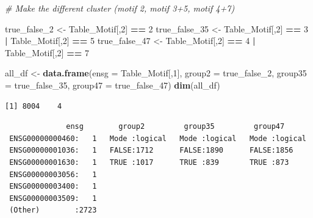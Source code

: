 \documentclass[]{article}
\newenvironment{Shaded}{\begin{snugshade}}{\end{snugshade}}
\newcommand{\KeywordTok}[1]{\textcolor[rgb]{0.13,0.29,0.53}{\textbf{#1}}}
\newcommand{\DataTypeTok}[1]{\textcolor[rgb]{0.13,0.29,0.53}{#1}}
\newcommand{\DecValTok}[1]{\textcolor[rgb]{0.00,0.00,0.81}{#1}}
\newcommand{\StringTok}[1]{\textcolor[rgb]{0.31,0.60,0.02}{#1}}
\newcommand{\CommentTok}[1]{\textcolor[rgb]{0.56,0.35,0.01}{\textit{#1}}}
\newcommand{\OperatorTok}[1]{\textcolor[rgb]{0.81,0.36,0.00}{\textbf{#1}}}
\newcommand{\NormalTok}[1]{#1}
\begin{document}
\begin{Shaded}
\begin{Highlighting}[]
\CommentTok{# Make the different cluster (motif 2, motif 3+5, motif 4+7)}

\NormalTok{true_false_}\DecValTok{2}\NormalTok{ <-}\StringTok{ }\NormalTok{Table_Motif[,}\DecValTok{2}\NormalTok{] }\OperatorTok{==}\StringTok{ }\DecValTok{2}
\NormalTok{true_false_}\DecValTok{35}\NormalTok{ <-}\StringTok{ }\NormalTok{Table_Motif[,}\DecValTok{2}\NormalTok{] }\OperatorTok{==}\StringTok{ }\DecValTok{3} \OperatorTok{|}\StringTok{ }\NormalTok{Table_Motif[,}\DecValTok{2}\NormalTok{] }\OperatorTok{==}\StringTok{ }\DecValTok{5}
\NormalTok{true_false_}\DecValTok{47}\NormalTok{ <-}\StringTok{ }\NormalTok{Table_Motif[,}\DecValTok{2}\NormalTok{] }\OperatorTok{==}\StringTok{ }\DecValTok{4} \OperatorTok{|}\StringTok{ }\NormalTok{Table_Motif[,}\DecValTok{2}\NormalTok{] }\OperatorTok{==}\StringTok{ }\DecValTok{7}

\NormalTok{all_df <-}\StringTok{ }\KeywordTok{data.frame}\NormalTok{(}\DataTypeTok{ensg =}\NormalTok{ Table_Motif[,}\DecValTok{1}\NormalTok{], }\DataTypeTok{group2 =}\NormalTok{ true_false_}\DecValTok{2}\NormalTok{, }\DataTypeTok{group35 =}\NormalTok{ true_false_}\DecValTok{35}\NormalTok{, }\DataTypeTok{group47 =}\NormalTok{ true_false_}\DecValTok{47}\NormalTok{)}
\KeywordTok{dim}\NormalTok{(all_df)}
\end{Highlighting}
\end{Shaded}

\begin{verbatim}
[1] 8004    4
\end{verbatim}

\begin{Shaded}
\end{Shaded}

\begin{verbatim}
              ensg        group2         group35         group47       
 ENSG00000000460:   1   Mode :logical   Mode :logical   Mode :logical  
 ENSG00000001036:   1   FALSE:1712      FALSE:1890      FALSE:1856     
 ENSG00000001630:   1   TRUE :1017      TRUE :839       TRUE :873      
 ENSG00000003056:   1                                                  
 ENSG00000003400:   1                                                  
 ENSG00000003509:   1                                                  
 (Other)        :2723                                                  
\end{verbatim}
\end{document}
